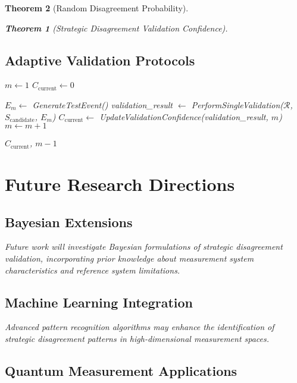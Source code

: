 \documentclass[12pt,a4paper]{article}
\newtheorem{theorem}{Theorem}
\begin{document}
\begin{theorem}[Random Disagreement Probability]
\begin{theorem}[Strategic Disagreement Validation Confidence]
\subsection{Adaptive Validation Protocols}

\begin{algorithm}[H]
\caption{Adaptive Strategic Disagreement Validation}
\label{alg:adaptive_validation}
\begin{algorithmic}[1]
    \State $m \gets 1$
    \State $C_{\text{current}} \gets 0$

        \State $E_m \gets$ GenerateTestEvent()
        \State validation\_result $\gets$ PerformSingleValidation($\mathcal{R}$, $S_{\text{candidate}}$, $E_m$)
        \State $C_{\text{current}} \gets$ UpdateValidationConfidence(validation\_result, $m$)
        \State $m \gets m + 1$
    \EndWhile

    \State \Return $C_{\text{current}}$, $m-1$
\EndProcedure
\end{algorithmic}
\end{algorithm}

\section{Future Research Directions}

\subsection{Bayesian Extensions}

Future work will investigate Bayesian formulations of strategic disagreement validation, incorporating prior knowledge about measurement system characteristics and reference system limitations.

\subsection{Machine Learning Integration}

Advanced pattern recognition algorithms may enhance the identification of strategic disagreement patterns in high-dimensional measurement spaces.

\subsection{Quantum Measurement Applications}


\end{theorem}
\end{theorem}
\end{document}
